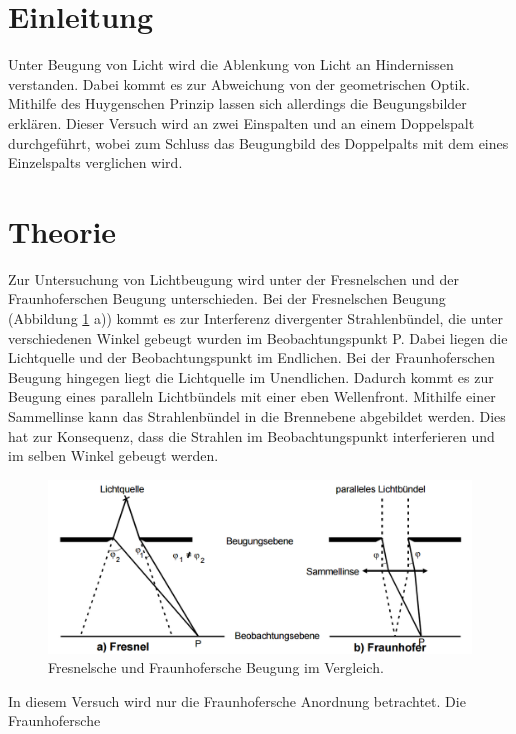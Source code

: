 
\section{Einleitung}
Unter Beugung von Licht wird die Ablenkung von Licht an Hindernissen verstanden.
Dabei kommt es zur Abweichung von der geometrischen Optik.
Mithilfe des Huygenschen Prinzip lassen sich allerdings die Beugungsbilder erklären.
\newline
Dieser Versuch wird an zwei Einspalten und an einem Doppelspalt durchgeführt, wobei
zum Schluss das Beugungbild des Doppelpalts mit dem eines Einzelspalts verglichen wird.
\section{Theorie}
Zur Untersuchung von Lichtbeugung wird unter der Fresnelschen und der Fraunhoferschen
Beugung unterschieden.
\newline
Bei der Fresnelschen Beugung (Abbildung \ref{fig:1} a)) kommt es zur Interferenz
divergenter Strahlenbündel, die unter verschiedenen Winkel gebeugt wurden im Beobachtungspunkt P.
Dabei liegen die Lichtquelle und der Beobachtungspunkt im Endlichen.\newline
Bei der Fraunhoferschen Beugung hingegen liegt die Lichtquelle im Unendlichen. Dadurch
kommt es zur Beugung eines paralleln Lichtbündels mit einer eben Wellenfront. Mithilfe einer
Sammellinse kann das Strahlenbündel in die Brennebene abgebildet werden. Dies hat zur Konsequenz,
dass die Strahlen im Beobachtungspunkt interferieren und im selben Winkel gebeugt werden.
\newline
\begin{figure}
 \centering
  \includegraphics[scale=0.5]{bild1.png}
  \caption{Fresnelsche und Fraunhofersche Beugung im Vergleich.\cite{on1}}
  \label{fig:1}
\end{figure}
\newline
In diesem Versuch wird nur die Fraunhofersche Anordnung betrachtet. Die Fraunhofersche
